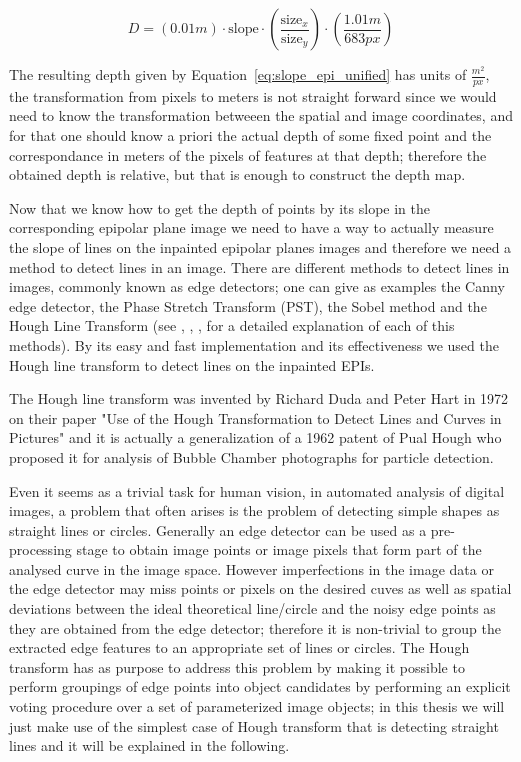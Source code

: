 \begin{equation}
\label{eq:slope_epi_unified}
D = (0.01m)\cdot \textrm{slope}\cdot\left(\frac{\textrm{size}_x}{\textrm{size}_y}\right)\cdot\left(\frac{1.01m}{683px}\right)
\end{equation}

\bigskip

The resulting depth given by Equation~\ref{eq:slope_epi_unified} has units of $\frac{m^2}{px}$, the transformation from pixels to meters is not straight forward since we would need to know the transformation betweeen the spatial and image coordinates, and for that one should know a priori the actual depth of some fixed point and the correspondance in meters of the pixels of features at that depth; therefore the obtained depth is relative, but that is enough to construct the depth map.

\bigskip

Now that we know how to get the depth of points by its slope in the corresponding epipolar plane image we need to have a way to actually measure the slope of lines on the inpainted epipolar planes images and therefore we need a method to detect lines in an image. There are different methods to detect lines in images, commonly known as edge detectors; one can give as examples the Canny edge detector, the Phase Stretch Transform (PST), the Sobel method and the Hough Line Transform (see \cite{LearnOpenCV}, \cite{MultipleView}, \cite{hough-duda}, \cite{hough-invented} for a detailed explanation of each of this methods). By its easy and fast implementation and its effectiveness we used the Hough line transform to detect lines on the inpainted EPIs. 

\bigskip

The Hough line transform was invented by Richard Duda and Peter Hart in 1972 on their paper "Use of the Hough Transformation to Detect Lines and Curves in Pictures"\cite{hough-duda} and it is actually a generalization of a 1962 patent of Pual Hough\cite{hough-original} who proposed it for analysis of Bubble Chamber photographs for particle detection.

\bigskip

Even it seems as a trivial task for human vision, in automated analysis of digital images, a problem that often arises is the problem of detecting simple shapes as straight lines or circles. Generally an edge detector can be used as a pre-processing stage to obtain image points or image pixels that form part of the analysed curve in the image space. However imperfections in the image data or the edge detector may miss points or pixels on the desired cuves as well as spatial deviations between the ideal theoretical line/circle and the noisy edge points as they are obtained from the edge detector; therefore it is non-trivial to group the extracted edge features to an appropriate set of lines or circles. The Hough transform has as purpose to address this problem by making it possible to perform groupings of edge points into object candidates by performing an explicit voting procedure over a set of parameterized image objects; in this thesis we will just make use of the simplest case of Hough transform that is detecting straight lines and it will be explained in the following.

